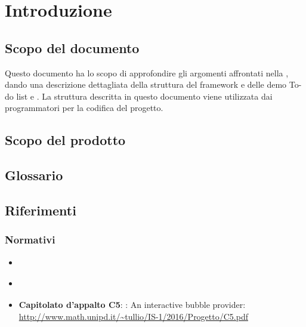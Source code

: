 \section{Introduzione}

\subsection{Scopo del documento}
Questo documento ha lo scopo di approfondire gli argomenti affrontati nella \SpecificaTecnica{}, dando una descrizione dettagliata della struttura del framework \ProjectName{} e delle demo To-do list e \DemoName{}. La struttura descritta in questo documento viene utilizzata dai programmatori per la codifica del progetto.

\subsection{Scopo del prodotto}
\ScopoDelProdotto

\subsection{Glossario}
\GlossarioIntroduzione

\subsection{Riferimenti}
\subsubsection{Normativi}
\begin{itemize}
	\item \textbf{\NormeDiProgetto}
	\item \textbf{\AnalisiDeiRequisiti}
	\item \textbf{Capitolato d'appalto C5}: \ProjectName{}: An interactive bubble provider:\\ \url{http://www.math.unipd.it/~tullio/IS-1/2016/Progetto/C5.pdf}
\end{itemize}
